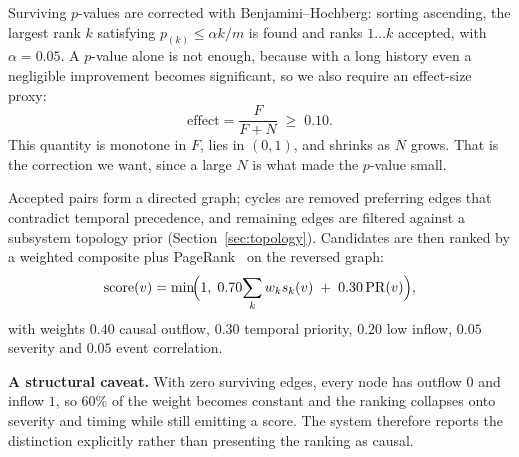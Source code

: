 \documentclass[conference]{IEEEtran}
\begin{document}
Surviving $p$-values are corrected with Benjamini--Hochberg: sorting ascending,
the largest rank $k$ satisfying $p_{(k)} \le \alpha k / m$ is found and ranks
$1\ldots k$ accepted, with $\alpha = 0.05$. A $p$-value alone is not enough,
because with a long history even a negligible improvement becomes significant,
so we also require an effect-size proxy:
\begin{equation}
\mathrm{effect} = \frac{F}{F+N} \;\ge\; 0.10 .
\end{equation}
This quantity is monotone in $F$, lies in $(0,1)$, and shrinks as $N$ grows.
That is the correction we want, since a large $N$ is what made the $p$-value
small.

Accepted pairs form a directed graph; cycles are removed preferring edges that
contradict temporal precedence, and remaining edges are filtered against a
subsystem topology prior (Section~\ref{sec:topology}). Candidates are then
ranked by a weighted composite plus PageRank~\cite{page1999pagerank} on the
reversed graph:
\begin{equation}
\mathrm{score}(v) = \min\!\Bigl(1,\; 0.70\!\sum_k w_k s_k(v) \;+\; 0.30\,\mathrm{PR}(v)\Bigr),
\end{equation}
with weights $0.40$ causal outflow, $0.30$ temporal priority, $0.20$ low
inflow, $0.05$ severity and $0.05$ event correlation.

\textbf{A structural caveat.} With zero surviving edges, every node has
outflow $0$ and inflow $1$, so $60\%$ of the weight becomes constant and the
ranking collapses onto severity and timing while still emitting a score. The
system therefore reports the distinction explicitly rather than presenting the
ranking as causal.
\end{document}
